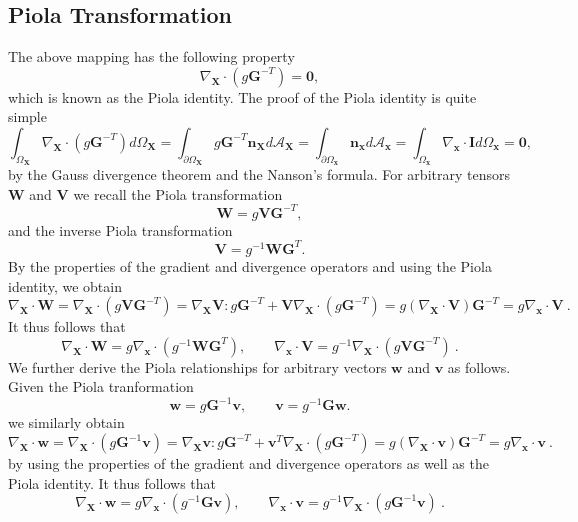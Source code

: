 \documentclass[11pt]{article}
\begin{document}
\subsection{Piola Transformation}

The above mapping has the following property 
\begin{equation}
\nabla_{\bm{X}} \cdot (g \bm{G}^{-T}) = \bm{0} ,
\end{equation}
which is known as the Piola identity. The proof of the Piola identity is quite simple
\begin{equation}
\int_{\Omega_{\bm{X}}} \nabla_{\bm{X}} \cdot (g \bm{G}^{-T}) d \Omega_{\bm{X}} = \int_{\partial \Omega_{\bm{X}}} g \bm{G}^{-T} \bm{n}_{\bm{X}} d \mathcal{A}_{\bm{X}}  = \int_{\partial \Omega_{\bm{x}}}  \bm{n}_{\bm{x}} d \mathcal{A}_{\bm{x}} = \int_{\Omega_{\bm{x}}}  \nabla_{\bm{x}} \cdot \bm{I} d \Omega_{\bm{x}}  =  \bm{0} ,
\end{equation}
by the Gauss divergence theorem and the Nanson's formula. For arbitrary tensors $\bm{W}$ and $\bm{V}$  we recall the Piola transformation 
\begin{equation}
\bm{W} = g \bm{V} \bm{G}^{-T} ,
\end{equation}
and the inverse Piola transformation
\begin{equation}
\bm{V} = g^{-1} \bm{W} \bm{G}^{T} .
\end{equation}
By the properties of the gradient and divergence operators and using the Piola identity, we obtain
\begin{equation}
\nabla_{\bm{X}} \cdot \bm{W} = \nabla_{\bm{X}} \cdot (g \bm{V} \bm{G}^{-T}) = \nabla_{\bm{X}} \bm{V} : g  \bm{G}^{-T} + \bm{V} \nabla_{\bm{X}} \cdot (g \bm{G}^{-T}) =  g (\nabla_{\bm{X}} \cdot \bm{V})  \bm{G}^{-T} = g \nabla_{\bm{x}} \cdot \bm{V} \ .
\end{equation}
It thus follows that
\begin{equation}
\nabla_{\bm{X}} \cdot \bm{W} =  g \nabla_{\bm{x}} \cdot (g^{-1} \bm{W} \bm{G}^{T}) , \qquad  \nabla_{\bm{x}} \cdot \bm{V} =  g^{-1} \nabla_{\bm{X}} \cdot (g \bm{V} \bm{G}^{-T})  \ .
\end{equation}
We further derive the Piola relationships for arbitrary vectors $\bm{w}$ and $\bm{v}$ as follows. Given the Piola tranformation
\begin{equation}
\bm{w} = g \bm{G}^{-1} \bm{v}, \qquad \bm{v} = g^{-1} \bm{G}  \bm{w} .
\end{equation}
we similarly obtain
\begin{equation}
\nabla_{\bm{X}} \cdot \bm{w} = \nabla_{\bm{X}} \cdot (g  \bm{G}^{-1} \bm{v}) = \nabla_{\bm{X}} \bm{v} : g  \bm{G}^{-T} + \bm{v}^T \nabla_{\bm{X}} \cdot (g \bm{G}^{-T}) =  g (\nabla_{\bm{X}} \cdot \bm{v})  \bm{G}^{-T} = g \nabla_{\bm{x}} \cdot \bm{v} \ .
\end{equation}
by using the properties of the gradient and divergence operators as well as the Piola identity. It thus follows that
\begin{equation}
\nabla_{\bm{X}} \cdot \bm{w} =  g \nabla_{\bm{x}} \cdot (g^{-1} \bm{G} \bm{v}) , \qquad  \nabla_{\bm{x}} \cdot \bm{v} =  g^{-1} \nabla_{\bm{X}} \cdot (g  \bm{G}^{-1} \bm{v})  \ .
\end{equation}
\end{document}
